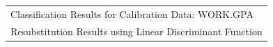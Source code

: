 \begin{mvbox}
{\begin{center}
\begin{tabular}{|l|}
\hline
Classification Results for Calibration Data: WORK.GPA\\
Resubstitution Results using Linear Discriminant Function\\
\hline
\end{tabular}
\end{center}
}
\end{mvbox}
